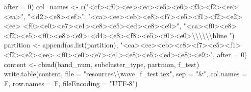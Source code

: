 \documentclass[
]{article}
\newenvironment{Shaded}{\begin{snugshade}}{\end{snugshade}}
\newcommand{\AttributeTok}[1]{\textcolor[rgb]{0.77,0.63,0.00}{#1}}
\newcommand{\DecValTok}[1]{\textcolor[rgb]{0.00,0.00,0.81}{#1}}
\newcommand{\FunctionTok}[1]{\textcolor[rgb]{0.00,0.00,0.00}{#1}}
\newcommand{\NormalTok}[1]{#1}
\newcommand{\OtherTok}[1]{\textcolor[rgb]{0.56,0.35,0.01}{#1}}
\newcommand{\SpecialCharTok}[1]{\textcolor[rgb]{0.00,0.00,0.00}{#1}}
\newcommand{\StringTok}[1]{\textcolor[rgb]{0.31,0.60,0.02}{#1}}
\begin{document}
\begin{Shaded}
\begin{Highlighting}[]
    \AttributeTok{after =} \DecValTok{0}\NormalTok{)}
\NormalTok{col\_names }\OtherTok{\textless{}{-}} \FunctionTok{c}\NormalTok{(}\StringTok{"\textless{}cf\textgreater{}\textless{}f0\textgreater{}\textless{}ee\textgreater{}\textless{}ec\textgreater{}\textless{}e5\textgreater{}\textless{}e6\textgreater{}\textless{}f3\textgreater{}\textless{}f2\textgreater{}\textless{}ee\textgreater{}\textless{}ea\textgreater{}"}\NormalTok{, }\StringTok{"\textless{}d2\textgreater{}\textless{}e8\textgreater{}\textless{}ef\textgreater{}"}\NormalTok{, }\StringTok{"\textless{}ca\textgreater{}\textless{}ee\textgreater{}\textless{}eb\textgreater{}\textless{}e8\textgreater{}\textless{}f7\textgreater{}\textless{}e5\textgreater{}\textless{}f1\textgreater{}\textless{}f2\textgreater{}\textless{}e2\textgreater{}\textless{}ee\textgreater{} \textless{}f0\textgreater{}\textless{}e0\textgreater{}\textless{}e7\textgreater{}\textless{}e1\textgreater{}\textless{}e8\textgreater{}\textless{}e5\textgreater{}\textless{}ed\textgreater{}\textless{}e8\textgreater{}\textless{}e9\textgreater{}"}\NormalTok{, }
    \StringTok{"\textless{}ca\textgreater{}\textless{}f0\textgreater{}\textless{}e8\textgreater{}\textless{}f2\textgreater{}\textless{}e5\textgreater{}\textless{}f0\textgreater{}\textless{}e8\textgreater{}\textless{}e9\textgreater{} \textless{}d4\textgreater{}\textless{}e8\textgreater{}\textless{}f8\textgreater{}\textless{}e5\textgreater{}\textless{}f0\textgreater{}\textless{}e0\textgreater{}}\SpecialCharTok{\textbackslash{}\textbackslash{}\textbackslash{}\textbackslash{}\textbackslash{}\textbackslash{}}\StringTok{hline "}\NormalTok{)}
\NormalTok{partition }\OtherTok{\textless{}{-}} \FunctionTok{append}\NormalTok{(}\FunctionTok{as.list}\NormalTok{(partition), }\StringTok{"\textless{}ca\textgreater{}\textless{}ee\textgreater{}\textless{}eb\textgreater{}\textless{}e8\textgreater{}\textless{}f7\textgreater{}\textless{}e5\textgreater{}\textless{}f1\textgreater{}\textless{}f2\textgreater{}\textless{}e2\textgreater{}\textless{}ee\textgreater{} \textless{}f0\textgreater{}\textless{}e0\textgreater{}\textless{}e7\textgreater{}\textless{}e1\textgreater{}\textless{}e8\textgreater{}\textless{}e5\textgreater{}\textless{}ed\textgreater{}\textless{}e8\textgreater{}\textless{}e9\textgreater{}"}\NormalTok{, }
    \AttributeTok{after =} \DecValTok{0}\NormalTok{)}
\NormalTok{content }\OtherTok{\textless{}{-}} \FunctionTok{cbind}\NormalTok{(band\_num, subcluster\_type, partition, f\_test)}
\FunctionTok{write.table}\NormalTok{(content, }\AttributeTok{file =} \StringTok{"resources}\SpecialCharTok{\textbackslash{}\textbackslash{}}\StringTok{wave\_f\_test.tex"}\NormalTok{, }\AttributeTok{sep =} \StringTok{"\&"}\NormalTok{, }\AttributeTok{col.names =}\NormalTok{ F, }
    \AttributeTok{row.names =}\NormalTok{ F, }\AttributeTok{fileEncoding =} \StringTok{"UTF{-}8"}\NormalTok{)}
\end{Highlighting}
\end{Shaded}
\end{document}
